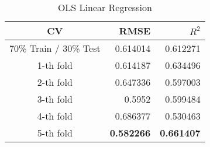 \begin{table}
\centering
  \caption{OLS Linear Regression}
  \begin{tabular}{crr}
    \toprule
    {CV} & {RMSE} & {$R^2$} \\\hline
    70\% Train / 30\% Test & 0.614014 & 0.612271 \\
    1-th fold & 0.614187 & 0.634496 \\
    2-th fold & 0.647336 & 0.597003 \\
    3-th fold & 0.5952 & 0.599484 \\
    4-th fold & 0.686377 & 0.530463 \\
    5-th fold & \textbf{0.582266} & \textbf{0.661407} \\\bottomrule
  \end{tabular}
\end{table}
